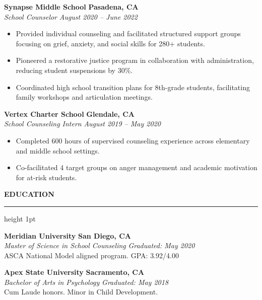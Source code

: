 \documentclass[10pt,letterpaper]{article}
\newcommand{\cvsection}[1]{%
  \vspace{6pt}%
  {\color{primarycolor}\large\bfseries\MakeUppercase{#1}}%
  \vspace{1.5pt}%
  {\color{sectionline}\hrule height 1pt}%
  \vspace{3pt}%
}
\begin{document}
\vspace{3pt}

\textbf{Synapse Middle School} \hfill \textbf{Pasadena, CA} \\
\textit{School Counselor} \hfill \textit{August 2020 -- June 2022}
\begin{itemize}[leftmargin=1.5em, nosep, label=\raisebox{0.25ex}{\tiny$\bullet$}]
    \item Provided individual counseling and facilitated structured support groups focusing on grief, anxiety, and social skills for 280+ students.
    \item Pioneered a restorative justice program in collaboration with administration, reducing student suspensions by 30\%.
    \item Coordinated high school transition plans for 8th-grade students, facilitating family workshops and articulation meetings.
\end{itemize}

\vspace{3pt}

\textbf{Vertex Charter School} \hfill \textbf{Glendale, CA} \\
\textit{School Counseling Intern} \hfill \textit{August 2019 -- May 2020}
\begin{itemize}[leftmargin=1.5em, nosep, label=\raisebox{0.25ex}{\tiny$\bullet$}]
    \item Completed 600 hours of supervised counseling experience across elementary and middle school settings.
    \item Co-facilitated 4 target groups on anger management and academic motivation for at-risk students.
\end{itemize}

\cvsection{Education}

\textbf{Meridian University} \hfill \textbf{San Diego, CA} \\
\textit{Master of Science in School Counseling} \hfill \textit{Graduated: May 2020} \\
ASCA National Model aligned program. GPA: 3.92/4.00

\vspace{2pt}

\textbf{Apex State University} \hfill \textbf{Sacramento, CA} \\
\textit{Bachelor of Arts in Psychology} \hfill \textit{Graduated: May 2018} \\
Cum Laude honors. Minor in Child Development.
\end{document}
